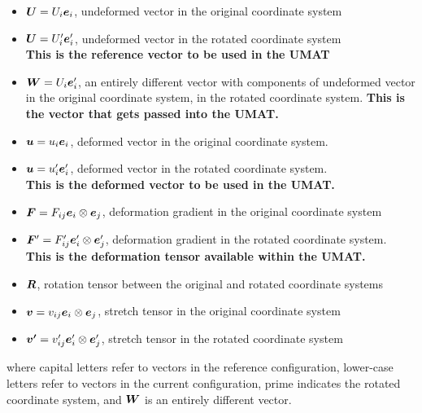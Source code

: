 \documentclass[10pt,letterpaper,oneside]{report}
\newcommand{\ten}[1]{\mbox{\boldmath $#1$}{}}
\begin{document}
\begin{itemize}
\item $\ten{U} = U_i \ten{e}_i$, undeformed vector in the original coordinate system
\item $\ten{U} = U'_i \ten{e}'_i$, undeformed vector in the rotated coordinate system  \\ 
\textbf{This is the reference vector to be used in the UMAT}
\item $\ten{W} = U_i \ten{e}'_i$, an entirely different vector with components of undeformed vector in the original coordinate system, in the rotated coordinate system.  \textbf{This is the vector that gets passed into the UMAT.}
\item $\ten{u} = u_i \ten{e}_i$, deformed vector in the original coordinate system.
\item $\ten{u} = u'_i \ten{e}'_i$, deformed vector in the rotated coordinate system.  \\
\textbf{This is the deformed vector to be used in the UMAT.}
\item $\ten{F} = F_{ij} \ten{e}_i \otimes \ten{e}_j $, deformation gradient in the original coordinate system
\item $\ten{F}' = F'_{ij} \ten{e}'_i \otimes \ten{e}'_j $, deformation gradient in the rotated coordinate system.  \\
\textbf{This is the deformation tensor available within the UMAT.}
\item $\ten{R}$, rotation tensor between the original and rotated coordinate systems
\item $\ten{v} = v_{ij} \ten{e}_i \otimes \ten{e}_j $, stretch tensor in the original coordinate system
\item $\ten{v'} = v'_{ij} \ten{e}'_i \otimes \ten{e}'_j $, stretch tensor in the rotated coordinate system
\end{itemize}
where capital letters refer to vectors in the reference configuration, lower-case letters refer to vectors in the current configuration, prime indicates the rotated coordinate system, and $\ten{W}$ is an entirely different vector.
\end{document}
